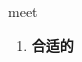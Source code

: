 
\begin{frame}
{\huge meet}
\begin{center}
\begin{enumerate}\Large
  \item \textbf{合适的}
\end{enumerate}
\end{center}
\end{frame}
